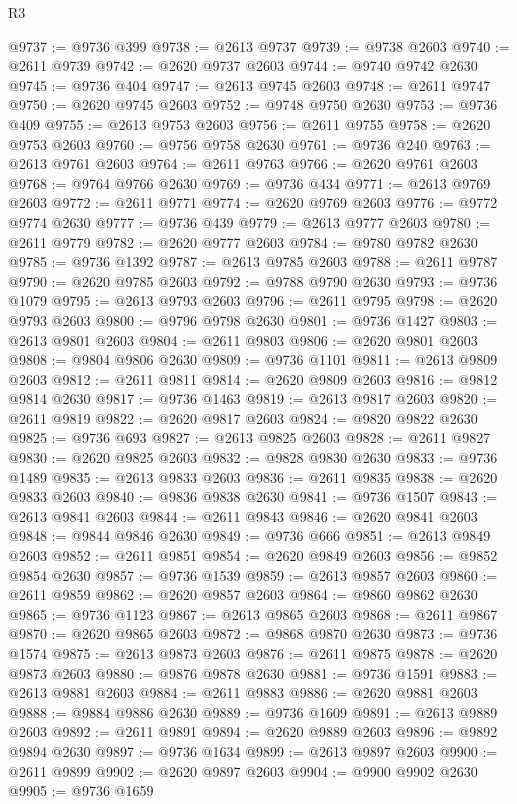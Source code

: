 \begin{lexlean}{R3}
\begin{coremodule}
@9737 := @9736 @399
@9738 := @2613 @9737
@9739 := @9738 @2603
@9740 := @2611 @9739
@9742 := @2620 @9737 @2603
@9744 := @9740 @9742 @2630
@9745 := @9736 @404
@9747 := @2613 @9745 @2603
@9748 := @2611 @9747
@9750 := @2620 @9745 @2603
@9752 := @9748 @9750 @2630
@9753 := @9736 @409
@9755 := @2613 @9753 @2603
@9756 := @2611 @9755
@9758 := @2620 @9753 @2603
@9760 := @9756 @9758 @2630
@9761 := @9736 @240
@9763 := @2613 @9761 @2603
@9764 := @2611 @9763
@9766 := @2620 @9761 @2603
@9768 := @9764 @9766 @2630
@9769 := @9736 @434
@9771 := @2613 @9769 @2603
@9772 := @2611 @9771
@9774 := @2620 @9769 @2603
@9776 := @9772 @9774 @2630
@9777 := @9736 @439
@9779 := @2613 @9777 @2603
@9780 := @2611 @9779
@9782 := @2620 @9777 @2603
@9784 := @9780 @9782 @2630
@9785 := @9736 @1392
@9787 := @2613 @9785 @2603
@9788 := @2611 @9787
@9790 := @2620 @9785 @2603
@9792 := @9788 @9790 @2630
@9793 := @9736 @1079
@9795 := @2613 @9793 @2603
@9796 := @2611 @9795
@9798 := @2620 @9793 @2603
@9800 := @9796 @9798 @2630
@9801 := @9736 @1427
@9803 := @2613 @9801 @2603
@9804 := @2611 @9803
@9806 := @2620 @9801 @2603
@9808 := @9804 @9806 @2630
@9809 := @9736 @1101
@9811 := @2613 @9809 @2603
@9812 := @2611 @9811
@9814 := @2620 @9809 @2603
@9816 := @9812 @9814 @2630
@9817 := @9736 @1463
@9819 := @2613 @9817 @2603
@9820 := @2611 @9819
@9822 := @2620 @9817 @2603
@9824 := @9820 @9822 @2630
@9825 := @9736 @693
@9827 := @2613 @9825 @2603
@9828 := @2611 @9827
@9830 := @2620 @9825 @2603
@9832 := @9828 @9830 @2630
@9833 := @9736 @1489
@9835 := @2613 @9833 @2603
@9836 := @2611 @9835
@9838 := @2620 @9833 @2603
@9840 := @9836 @9838 @2630
@9841 := @9736 @1507
@9843 := @2613 @9841 @2603
@9844 := @2611 @9843
@9846 := @2620 @9841 @2603
@9848 := @9844 @9846 @2630
@9849 := @9736 @666
@9851 := @2613 @9849 @2603
@9852 := @2611 @9851
@9854 := @2620 @9849 @2603
@9856 := @9852 @9854 @2630
@9857 := @9736 @1539
@9859 := @2613 @9857 @2603
@9860 := @2611 @9859
@9862 := @2620 @9857 @2603
@9864 := @9860 @9862 @2630
@9865 := @9736 @1123
@9867 := @2613 @9865 @2603
@9868 := @2611 @9867
@9870 := @2620 @9865 @2603
@9872 := @9868 @9870 @2630
@9873 := @9736 @1574
@9875 := @2613 @9873 @2603
@9876 := @2611 @9875
@9878 := @2620 @9873 @2603
@9880 := @9876 @9878 @2630
@9881 := @9736 @1591
@9883 := @2613 @9881 @2603
@9884 := @2611 @9883
@9886 := @2620 @9881 @2603
@9888 := @9884 @9886 @2630
@9889 := @9736 @1609
@9891 := @2613 @9889 @2603
@9892 := @2611 @9891
@9894 := @2620 @9889 @2603
@9896 := @9892 @9894 @2630
@9897 := @9736 @1634
@9899 := @2613 @9897 @2603
@9900 := @2611 @9899
@9902 := @2620 @9897 @2603
@9904 := @9900 @9902 @2630
@9905 := @9736 @1659

\end{coremodule}
\end{lexlean}
